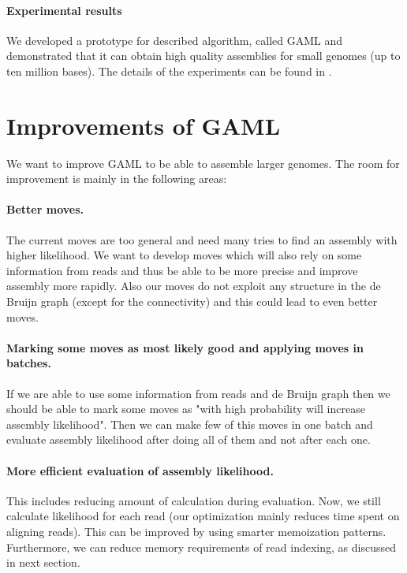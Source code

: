 \paragraph{Experimental results}
We developed a prototype for described algorithm, called GAML and
demonstrated that it can obtain high quality assemblies
for small genomes (up to ten million bases). The details
of the experiments can be found in \citet{GAML}.

\section{Improvements of GAML}

We want to improve GAML to be able to assemble larger genomes.
The room for improvement is mainly in the following areas:

\paragraph{Better moves.}
The current moves are too general and need many tries to
find an assembly with higher likelihood. We want to develop
moves which will also rely on some information from reads
and thus be able to be more precise and improve
assembly more rapidly. Also our moves
do not exploit any structure in the de Bruijn graph (except for the connectivity)
and this could lead to even better moves.

\paragraph{Marking some moves as most likely good and applying moves in batches.}
If we are able to use some information from reads and de Bruijn graph
then we should be able to mark some moves as "with high probability will increase
assembly likelihood". Then we can make few of this moves in one
batch and evaluate assembly likelihood after doing all of them
and not after each one.

\paragraph{More efficient evaluation of assembly likelihood.}
This includes reducing amount of calculation during evaluation.
Now, we still calculate likelihood for each read (our optimization
mainly reduces time spent on aligning reads). This can
be improved by using smarter memoization patterns.
Furthermore, we can reduce memory requirements
of read indexing, as discussed in next section.

